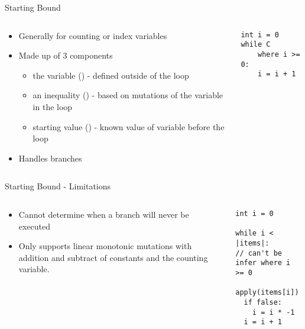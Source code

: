 \begin{frame}[fragile]{Starting Bound}

\begin{columns}

\begin{column}{0.5\textwidth}
\begin{itemize}
\item Generally for counting or index variables
\item Made up of 3 components
\begin{itemize}
    \item the variable () - defined outside of the loop
    \item an inequality (\code{>=}) - based on mutations of the variable in the loop
    \item starting value () - known value of variable before the loop
\end{itemize}

\item Handles branches

\end{itemize}
\end{column}

\begin{column}{0.5\textwidth}
\begin{verbatim}
int i = 0
while C
    where i >= 0:
    i = i + 1
\end{verbatim}
\end{column}

\end{columns}

\end{frame}


\begin{frame}[fragile]{Starting Bound - Limitations}

\begin{columns}

\begin{column}{0.5\textwidth}
\begin{itemize}
    \item Cannot determine when a branch will never be executed
    \item Only supports linear monotonic mutations with addition and subtract
        of constants and the counting variable.
\end{itemize}
\end{column}

\begin{column}{0.5\textwidth}
\begin{verbatim}
int i = 0

while i < |items|:
// can't be infer where i >= 0
  apply(items[i])
  if false:
    i = i * -1
  i = i + 1
\end{verbatim}
\end{column}

\end{columns}

\end{frame}


